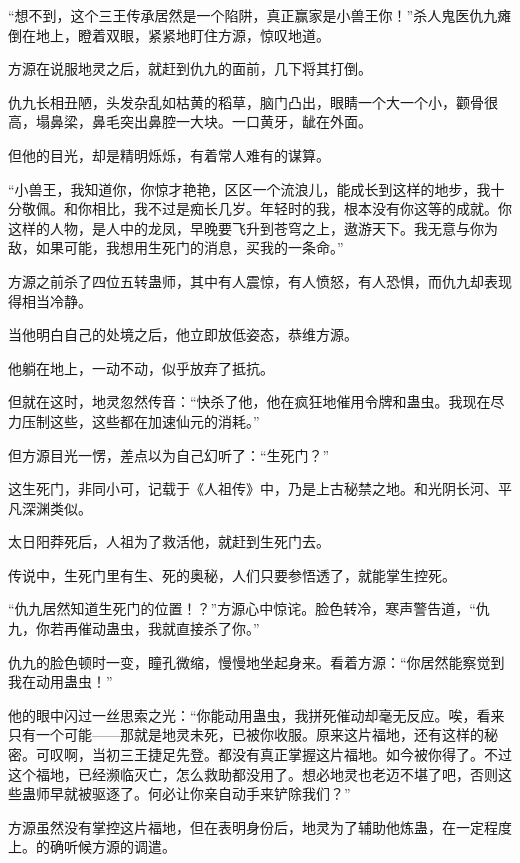
\begin{this_body}

“想不到，这个三王传承居然是一个陷阱，真正赢家是小兽王你！”杀人鬼医仇九瘫倒在地上，瞪着双眼，紧紧地盯住方源，惊叹地道。

方源在说服地灵之后，就赶到仇九的面前，几下将其打倒。

仇九长相丑陋，头发杂乱如枯黄的稻草，脑门凸出，眼睛一个大一个小，颧骨很高，塌鼻梁，鼻毛突出鼻腔一大块。一口黄牙，龇在外面。

但他的目光，却是精明烁烁，有着常人难有的谋算。

“小兽王，我知道你，你惊才艳艳，区区一个流浪儿，能成长到这样的地步，我十分敬佩。和你相比，我不过是痴长几岁。年轻时的我，根本没有你这等的成就。你这样的人物，是人中的龙凤，早晚要飞升到苍穹之上，遨游天下。我无意与你为敌，如果可能，我想用生死门的消息，买我的一条命。”

方源之前杀了四位五转蛊师，其中有人震惊，有人愤怒，有人恐惧，而仇九却表现得相当冷静。

当他明白自己的处境之后，他立即放低姿态，恭维方源。

他躺在地上，一动不动，似乎放弃了抵抗。

但就在这时，地灵忽然传音：“快杀了他，他在疯狂地催用令牌和蛊虫。我现在尽力压制这些，这些都在加速仙元的消耗。”

但方源目光一愣，差点以为自己幻听了：“生死门？”

这生死门，非同小可，记载于《人祖传》中，乃是上古秘禁之地。和光阴长河、平凡深渊类似。

太日阳莽死后，人祖为了救活他，就赶到生死门去。

传说中，生死门里有生、死的奥秘，人们只要参悟透了，就能掌生控死。

“仇九居然知道生死门的位置！？”方源心中惊诧。脸色转冷，寒声警告道，“仇九，你若再催动蛊虫，我就直接杀了你。”

仇九的脸色顿时一变，瞳孔微缩，慢慢地坐起身来。看着方源：“你居然能察觉到我在动用蛊虫！”

他的眼中闪过一丝思索之光：“你能动用蛊虫，我拼死催动却毫无反应。唉，看来只有一个可能——那就是地灵未死，已被你收服。原来这片福地，还有这样的秘密。可叹啊，当初三王捷足先登。都没有真正掌握这片福地。如今被你得了。不过这个福地，已经濒临灭亡，怎么救助都没用了。想必地灵也老迈不堪了吧，否则这些蛊师早就被驱逐了。何必让你亲自动手来铲除我们？”

方源虽然没有掌控这片福地，但在表明身份后，地灵为了辅助他炼蛊，在一定程度上。的确听候方源的调遣。


\end{this_body}
